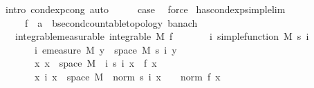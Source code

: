 \begin{isabellebody}
\ {\isacharparenleft}{\kern0pt}intro\ cond{\isacharunderscore}{\kern0pt}exp{\isacharunderscore}{\kern0pt}cong{\isacharcomma}{\kern0pt}\ auto{\isacharparenright}{\kern0pt}\isanewline
\ \ \isamarkupfalse%
\ \isamarkupfalse%
\ {\isacharquery}{\kern0pt}case\ \isamarkupfalse%
\ force\isanewline
{}\isamarkupfalse%
%
\endisatagproof
{\isafoldproof}%
%
\isadelimproof
\isanewline
%
\endisadelimproof
\isanewline
{}\isamarkupfalse%
\ has{\isacharunderscore}{\kern0pt}cond{\isacharunderscore}{\kern0pt}exp{\isacharunderscore}{\kern0pt}simple{\isacharunderscore}{\kern0pt}lim{\isacharcolon}{\kern0pt}\isanewline
\ \ \ \ \ f\ {\isacharcolon}{\kern0pt}{\isacharcolon}{\kern0pt}\ {\isachardoublequoteopen}{\isacharprime}{\kern0pt}a\ {\isasymRightarrow}\ {\isacharprime}{\kern0pt}b{\isacharcolon}{\kern0pt}{\isacharcolon}{\kern0pt}{\isacharbraceleft}{\kern0pt}second{\isacharunderscore}{\kern0pt}countable{\isacharunderscore}{\kern0pt}topology{\isacharcomma}{\kern0pt}\ banach{\isacharbraceright}{\kern0pt}{\isachardoublequoteclose}\isanewline
\ \ \ integrable{\isacharbrackleft}{\kern0pt}measurable{\isacharbrackright}{\kern0pt}{\isacharcolon}{\kern0pt}\ {\isachardoublequoteopen}integrable\ M\ f{\isachardoublequoteclose}\isanewline
\ \ \ \ \ \ \ {\isachardoublequoteopen}{\isasymAnd}i{\isachardot}{\kern0pt}\ simple{\isacharunderscore}{\kern0pt}function\ M\ {\isacharparenleft}{\kern0pt}s\ i{\isacharparenright}{\kern0pt}{\isachardoublequoteclose}\isanewline
\ \ \ \ \ \ \ {\isachardoublequoteopen}{\isasymAnd}i{\isachardot}{\kern0pt}\ emeasure\ M\ {\isacharbraceleft}{\kern0pt}y\ {\isasymin}\ space\ M{\isachardot}{\kern0pt}\ s\ i\ y\ {\isasymnoteq}\ {}{\isacharbraceright}{\kern0pt}\ {\isasymnoteq}\ {\isasyminfinity}{\isachardoublequoteclose}\isanewline
\ \ \ \ \ \ \ {\isachardoublequoteopen}{\isasymAnd}x{\isachardot}{\kern0pt}\ x\ {\isasymin}\ space\ M\ {\isasymLongrightarrow}\ {\isacharparenleft}{\kern0pt}{\isasymlambda}i{\isachardot}{\kern0pt}\ s\ i\ x{\isacharparenright}{\kern0pt}\ {\isasymlonglonglongrightarrow}\ f\ x{\isachardoublequoteclose}\isanewline
\ \ \ \ \ \ \ {\isachardoublequoteopen}{\isasymAnd}x\ i{\isachardot}{\kern0pt}\ x\ {\isasymin}\ space\ M\ {\isasymLongrightarrow}\ norm\ {\isacharparenleft}{\kern0pt}s\ i\ x{\isacharparenright}{\kern0pt}\ {\isasymle}\ {}\ {\isacharasterisk}{\kern0pt}\ norm\ {\isacharparenleft}{\kern0pt}f\ x{\isacharparenright}{\kern0pt}{\isachardoublequoteclose}\isanewline

\end{isabellebody}
